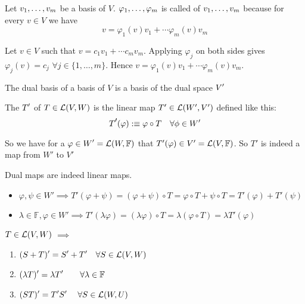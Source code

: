 \setcounter{thm}{113}
\begin{thm}
  Let $v_1, \dots, v_m$ be a basis of $V$. $\varphi_1, \dots, \varphi_m$ is called  of $v_1, \dots, v_m$ because for every $v \in V$ we have
  \begin{equation}
    v=\varphi_1 (v)v_1 + \cdots \varphi_m(v)v_m
  \end{equation}
\end{thm}
\begin{prf}
  Let $v \in V$ such that $v= c_1v_1 + \cdots c_mv_m$. Applying
  $\varphi_j$ on both sides gives $\varphi_j(v)=c_j$ $\forall j\in \{1, \dots, m\}$. Hence
  $v=\varphi_1 (v)v_1 + \cdots \varphi_m(v)v_m$.
\end{prf}

\setcounter{thm}{115}
\begin{thm}
  The dual basis of a basis of $V$ is a basis of the dual space $\dual{V}$
\end{thm}

\setcounter{thm}{117}
\begin{mydef}
  The  $\dual{T}$ of $T \in \mathcal{L}(V,W)$ is the linear map $T' \in {\mathcal{L}(W', V')}$ defined like this:
\begin{equation}
    \dual{T}(\varphi) :\equiv \varphi \circ T \quad \forall \phi \in W'
\end{equation}

    So we have for a $\varphi \in \dual{W}=\lin{W}{\mathbb{F}}$ that $T'(\varphi) \in V' = {\mathcal{L}(V, \mathbb{F})}$. So $T'$ is indeed a map from $W'$ to $V'$

    Dual maps are indeed linear maps.
\begin{itemize}
      \item $\varphi, \psi \in W' \implies T' (\varphi + \psi) = (\varphi + \psi) \circ T = \varphi \circ T + \psi \circ T = T' (\varphi) + T'(\psi)$
    \item $\lambda \in \mathbb{F}, \varphi \in W' \implies T' (\lambda \varphi) = (\lambda \varphi) \circ T = \lambda (\varphi \circ T) = \lambda T' (\varphi)$
\end{itemize}


\end{mydef}

\setcounter{thm}{119}
\begin{thm} 
  \label{algebraic-properties-of-dual-maps}
  $T \in \mathcal{L}(V,W)$ $\implies$
  \begin{enumerate}
    \item $\dual{(S+T)} = \dual{S} + \dual{T} \quad \forall S \in \linmap(V,W)$
    \item $\dual{(\lambda T)} = \lambda \dual{T} \quad \quad \forall \lambda \in \myF$
    \item $\dual{(ST)} = \dual{T}\dual{S} \quad \; \forall S \in \linmap (W,U)$
  \end{enumerate}
\end{thm}



